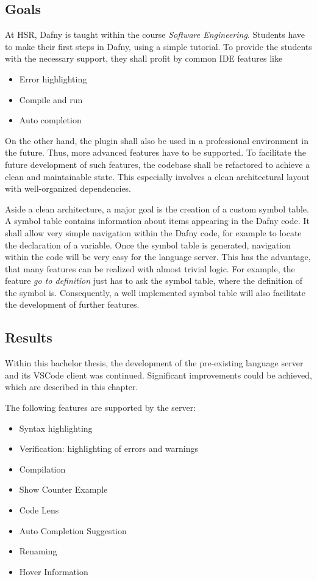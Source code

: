 \subsection{Goals}
At HSR, Dafny is taught within the course \textit{Software Engineering}.
Students have to make their first steps in Dafny, using a simple tutorial.
To provide the students with the necessary support, they shall profit by common IDE features like
\begin{itemize}
    \item Error highlighting
    \item Compile and run
    \item Auto completion
\end{itemize}

On the other hand, the plugin shall also be used in a professional environment in the future.
Thus, more advanced features have to be supported.
To facilitate the future development of such features, the codebase shall be refactored to achieve a clean and maintainable state.
This especially involves a clean architectural layout with well-organized dependencies.

Aside a clean architecture, a major goal is the creation of a custom symbol table.
A symbol table contains information about items appearing in the Dafny code.
It shall allow very simple navigation within the Dafny code, for example to locate the declaration of a variable.
Once the symbol table is generated, navigation within the code will be very easy for the language server.
This has the advantage, that many features can be realized with almost trivial logic.
For example, the feature \textit{go to definition} just has to ask the symbol table, where the definition of the symbol is.
Consequently, a well implemented symbol table will also facilitate the development of further features.



\subsection{Results}
Within this bachelor thesis, the development of the pre-existing language server and its VSCode client was continued.
Significant improvements could be achieved, which are described in this chapter.

The following features are supported by the server:
\begin{itemize}
    \item Syntax highlighting
    \item Verification: highlighting of errors and warnings
    \item Compilation
    \item Show Counter Example
    \item Code Lens
    \item Auto Completion Suggestion
    \item Renaming
    \item Hover Information
\end{itemize}

